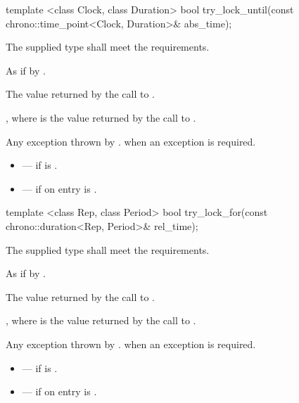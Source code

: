 %
\begin{itemdecl}
template <class Clock, class Duration>
  bool try_lock_until(const chrono::time_point<Clock, Duration>& abs_time);
\end{itemdecl}

\begin{itemdescr}
\pnum
\requires The supplied  type shall meet the 
requirements.

\pnum
\effects As if by .

\pnum
\returns The value returned by the call to .

\pnum
\postconditions {}, where  is the value returned by
the call to .

\pnum
\throws Any exception thrown by .  when an
exception is required.

\pnum
\errors
\begin{itemize}
\item {} --- if  is .
\item {} --- if on entry  is
.
\end{itemize}
\end{itemdescr}

%
\begin{itemdecl}
template <class Rep, class Period>
  bool try_lock_for(const chrono::duration<Rep, Period>& rel_time);
\end{itemdecl}

\begin{itemdescr}
\pnum
\requires The supplied  type shall meet the  requirements.

\pnum
\effects As if by .

\pnum
\returns The value returned by the call to .

\pnum
\postconditions {}, where  is the value returned by the call to .

\pnum
\throws Any exception thrown by .  when an
exception is required.

\pnum
\errors
\begin{itemize}
\item {} --- if  is .
\item {} --- if on entry  is
.
\end{itemize}
\end{itemdescr}


